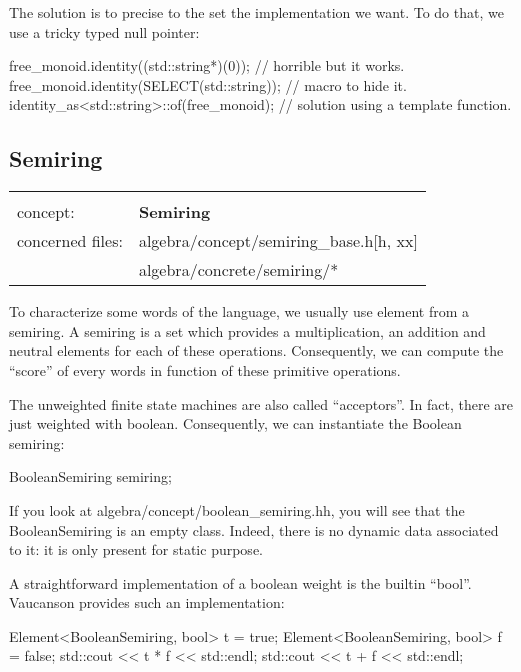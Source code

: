 \documentclass{article}
\begin{document}
\begin{code}
The solution is to precise to the set the implementation we want. To
do that, we use a tricky typed null pointer:

\begin{code}
free_monoid.identity((std::string*)(0));   // horrible but it works.
free_monoid.identity(SELECT(std::string)); // macro to hide it.
identity_as<std::string>::of(free_monoid); // solution using a template function.
\end{code}

\subsection{Semiring}

\begin{tabular}%
{ll}
\hline \\
concept: & \textbf{Semiring}  \\
concerned files: & algebra/concept/semiring\_base.h[h, xx] \\
                 & algebra/concrete/semiring/* \\
\hline 
\end{tabular}

To characterize some words of the language, we usually use element
from a semiring. A semiring is a set which provides a multiplication,
an addition and neutral elements for each of these operations.
Consequently, we can compute the ``score'' of every words in function of
these primitive operations.

The unweighted finite state machines are also called ``acceptors''. In
fact, there are just weighted with boolean. Consequently, we can
instantiate the Boolean semiring:

\begin{code}
BooleanSemiring semiring;
\end{code}

If you look at algebra/concept/boolean\_semiring.hh, you will see that
the BooleanSemiring is an empty class. Indeed, there is no dynamic
data associated to it: it is only present for static purpose.

A straightforward implementation of a boolean weight is the builtin
``bool''. Vaucanson provides such an implementation:

\begin{code}
Element<BooleanSemiring, bool> t = true;
Element<BooleanSemiring, bool> f = false;
std::cout << t * f << std::endl;
std::cout << t + f << std::endl;
\end{code}


\end{code}
\end{document}
